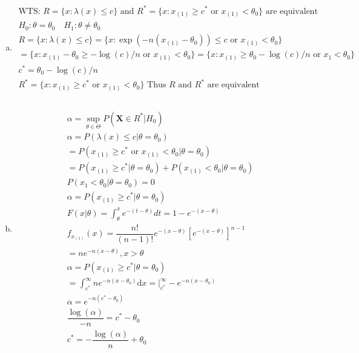 \documentclass{article}
\newcommand{\dx}{\mathrm{d}x}
\newcommand{\ta}{\theta}
\newcommand{\lx}{\lambda(x)}
\begin{document}
\begin{flushleft}
\begin{enumerate}[(a)]
	\item 
\begin{multline*}\\
\text{WTS: } R=\{x:\lx \leq c \}\text{ and }R^*=\{x:x_{(1)}\geq c^* \text{ or } x_{(1)}<\ta_0 \} \text{ are equivalent}\\
H_0:\ta=\ta_0 \quad H_1:\ta\neq \ta_0\\
R=\{x:\lx \leq c \}=\{x:\exp(-n(x_{(1)}-\ta_0))\leq c \text{ or } x_{(1)}<\ta_0 \}\\
=\{x:x_{(1)}-\ta_0 \geq -\log(c)/n  \text{ or } x_{(1)}<\ta_0\}=\{x:x_{(1)} \geq \ta_0-\log(c)/n  \text{ or } x_{1}<\ta_0\}\\
c^*=\ta_0-\log(c)/n\\
R^*=\{x:x_{(1)}\geq c^* \text{ or } x_{(1)}<\ta_0 \} \text{ Thus }R \text{ and } R^* \text{ are equivalent}\\
\end{multline*}

	\item 
\begin{multline*}\\
\alpha=\sup_{\ta \in \Theta}P(\bm{X}\in R^*|H_0)\\
\alpha=P(\lx\leq c|\ta=\ta_0)\\
=P(x_{(1)}\geq c^*  \text{ or } x_{(1)}<\ta_0|\ta=\ta_0)\\
=P(x_{(1)}\geq c^*|\ta=\ta_0)+P(x_{(1)}<\ta_0|\ta=\ta_0)\\
P(x_{1}<\ta_0|\ta=\ta_0)=0\\
\alpha=P(x_{(1)}\geq c^*|\ta=\ta_0)\\
F(x|\ta)=\int_{\ta}^{x} e^{-(t-\ta)} dt=1-e^{-(x-\ta)}\\
f_{x_{(1)}}(x)=\dfrac{n!}{(n-1)!}e^{-(x-\ta)}[e^{-(x-\ta)}]^{n-1}\\
=ne^{-n(x-\ta)}, x>\ta\\
\alpha=P(x_{(1)}\geq c^*|\ta=\ta_0)\\
=\int_{c^*}^{\infty}ne^{-n(x-\ta_0)} \dx=\bigg|_{c^*}^{\infty}-e^{-n(x-\ta_0)}\\
\alpha=e^{-n(c^*-\ta_0)}\\
\dfrac{\log(\alpha)}{-n}=c^*-\ta_0\\
c^*=-\dfrac{\log(\alpha)}{n}+\ta_0\\
\end{multline*}


\end{enumerate}
\end{flushleft}
\end{document}
